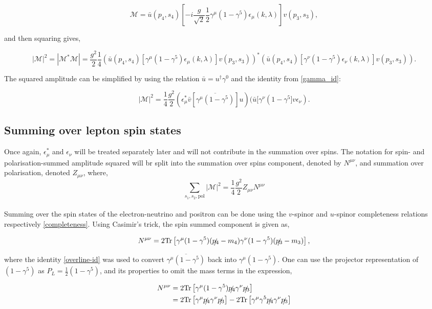 \documentclass[a4paper,11pt]{article}
\begin{document}
$$\mathcal{M} =\bar{u}(p_4, s_4) \left[-i \frac{g}{\sqrt{2}}\frac{1}{2}\gamma^\mu (1-\gamma^5) \epsilon_\mu (k, \lambda)\right] v(p_3, s_3),  $$

and then squaring gives,

$$ |\mathcal{M}|^2= |\mathcal{M}^*\mathcal{M}|= \frac{g^2}{2}\frac{1}{4}\left(\bar{u}(p_4, s_4) \left[\gamma^\mu (1-\gamma^5) \epsilon_\mu (k, \lambda)\right] v(p_3, s_3)\right)^*\left(\bar{u}(p_4, s_4) \left[\gamma^\nu (1-\gamma^5) \epsilon_\nu (k, \lambda)\right] v(p_3, s_3)\right). $$

The squared amplitude can be simplified by using the relation $\bar{u} = u^{\dagger}\gamma^0$ and the identity from \ref{gamma_id}:

$$|\mathcal{M}|^2 = \frac{1}{4} \frac{g^2}{2} (\epsilon_\mu^* \bar{v}[\overline{\gamma^\mu (1-\gamma^5)}]u)(\bar{u}[\gamma^\nu (1-\gamma^5] v \epsilon_\nu). $$

 \subsection{Summing over lepton spin states}
 Once again, $\epsilon_{\mu}^*$ and $\epsilon_{\nu}$ will be treated separately later and will not contribute in the summation over spins. The notation for spin- and polarisation-summed amplitude squared will br split into the summation over spins component, denoted by $N^{\mu\nu}$, and summation over polarisation, denoted $Z_{\mu \nu}$, where, $$\sum_{s_1, s_2, \text{pol}}|\mathcal{M}|^2=  \frac{1}{4} \frac{g^2}{2} Z_{\mu\nu}N^{\mu\nu} $$\\
 
 Summing over the spin states of the electron-neutrino and positron can be done using the $v$-spinor and $u$-spinor completeness relations respectively \ref{completeness}. Using Casimir's trick, the spin summed component is given as,
 
 $$N^{\mu\nu}= 2\text{Tr}\left[\gamma^\mu (1-\gamma^5)(\slashed{p_4}-m_4)\gamma^\nu (1-\gamma^5) (\slashed{p_3}-m_3)\right],$$
 
 where the identity \ref{overline-id} was used to convert $\overline{\gamma^\mu (1-\gamma^5)}$ back into $\gamma^\mu (1-\gamma^5).$ One can use the projector representation of $(1-\gamma^5)$ as $P_L = \frac{1}{2}(1-\gamma^5)$, and its properties to omit the mass terms in the expression, 
 
 \begin{equation}
 	\begin{aligned}
 		 N^{\mu\nu}&= 2\text{Tr}\left[\gamma^\mu (1-\gamma^5)\slashed{p_4}\gamma^\nu
 		\slashed{p_3}\right]\\
 		&= 2\text{Tr} \left[\gamma^\mu \slashed{p_4}\gamma^\nu \slashed{p_3}\right] - 2\text{Tr}\left[\gamma^\mu \gamma^5 \slashed{p_4}\gamma^\nu \slashed{p_3} \right]
 	\end{aligned}
 \end{equation}
\end{document}
